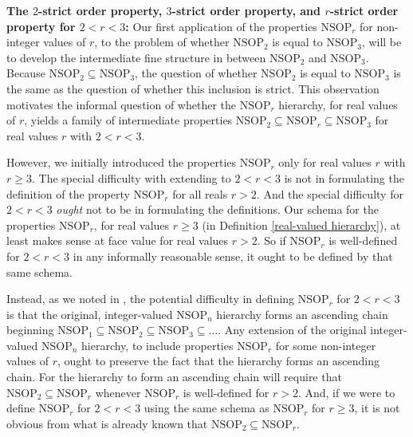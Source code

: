 \documentclass{amsart}
\theoremstyle{definition}
\theoremstyle{remark}
\numberwithin{equation}{section}
\begin{document}
\:



\textbf{The $2$-strict order property, $3$-strict order property, and $r$-strict order property for $2 < r < 3$:} Our first application of the properties $\mathrm{NSOP}_{r}$ for non-integer values of $r$, to the problem of whether $\mathrm{NSOP}_{2}$ is equal to $\mathrm{NSOP}_{3}$, will be to develop the intermediate fine structure in between $\mathrm{NSOP}_{2}$ and $\mathrm{NSOP}_{3}$. Because $\mathrm{NSOP}_{2} \subseteq \mathrm{NSOP}_{3}$, the question of whether $\mathrm{NSOP}_{2}$ is equal to $\mathrm{NSOP}_{3}$ is the same as the question of whether this inclusion is strict. This observation motivates the informal question of whether the $\mathrm{NSOP}_{r}$ hierarchy, for real values of $r$, yields a family of intermediate properties $\mathrm{NSOP}_{2} \subseteq \mathrm{NSOP}_{r} \subseteq \mathrm{NSOP}_{3}$ for real values $r$ with $2 < r < 3$.

However, we initially introduced the properties $\mathrm{NSOP}_{r}$ only for real values $r$ with $r \geq 3$. The special difficulty with extending to $2 < r < 3$ is not in formulating the definition of the property $\mathrm{NSOP}_{r}$ for all reals $r > 2$. And the special difficulty for $2 < r < 3$ \textit{ought} not to be in formulating the definitions. Our schema for the properties $\mathrm{NSOP}_{r}$, for real values $r \geq 3$ (in Definition \ref{real-valued hierarchy}), at least makes sense at face value for real values $r > 2$. So if $\mathrm{NSOP}_{r}$ is well-defined for $2 < r < 3$ in any informally reasonable sense, it ought to be defined by that same schema.

Instead, as we noted in \cite{ApproxOrder}, the potential difficulty in defining $\mathrm{NSOP}_{r}$ for $2 < r < 3$ is that the original, integer-valued $\mathrm{NSOP}_{n}$ hierarchy forms an ascending chain beginning $\mathrm{NSOP}_{1} \subseteq \mathrm{NSOP}_{2} \subseteq \mathrm{NSOP}_{3} \subseteq \ldots$. Any extension of the original integer-valued $\mathrm{NSOP}_{n}$ hierarchy, to include properties $\mathrm{NSOP}_{r}$ for some non-integer values of $r$, ought to preserve the fact that the hierarchy forms an ascending chain. For the hierarchy to form an ascending chain will require that $\mathrm{NSOP}_{2} \subseteq \mathrm{NSOP}_{r}$ whenever $\mathrm{NSOP}_{r}$ is well-defined for $r > 2$. And, if we were to define $\mathrm{NSOP}_{r}$ for $2 < r < 3$ using the same schema as $\mathrm{NSOP}_{r}$ for $r \geq 3$, it is not obvious from what is already known that $\mathrm{NSOP}_{2} \subseteq \mathrm{NSOP}_{r}$.
\end{document}
